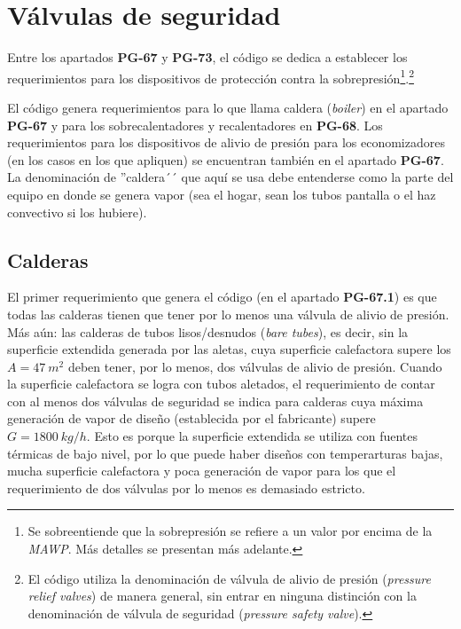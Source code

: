 \newpage
\section{Válvulas de seguridad}

Entre los apartados \textbf{PG-67} y \textbf{PG-73}, el código se dedica a establecer los requerimientos para los dispositivos de protección contra la sobrepresión\footnote{Se sobreentiende que la sobrepresión se refiere a un valor por encima de la \textit{MAWP}. Más detalles se presentan más adelante.}.\footnote{El código utiliza la denominación de válvula de alivio de presión (\textit{pressure relief valves}) de manera general, sin entrar en ninguna distinción con la denominación de válvula de seguridad (\textit{pressure safety valve}).} %

El código genera requerimientos para lo que llama caldera (\textit{boiler}) en el apartado \textbf{PG-67} y para los sobrecalentadores y recalentadores en \textbf{PG-68}. Los requerimientos para los dispositivos de alivio de presión para los economizadores (en los casos en los que apliquen) se encuentran también en el apartado \textbf{PG-67}. La denominación de ''caldera´´ que aquí se usa debe entenderse como la parte del equipo en donde se genera vapor (sea el hogar, sean los tubos pantalla o el haz convectivo si los hubiere).

\subsection{Calderas}

El primer requerimiento que genera el código (en el apartado \textbf{PG-67.1}) es que todas las calderas tienen que tener por lo menos una válvula de alivio de presión. Más aún: las calderas de tubos lisos/desnudos (\textit{bare tubes}), es decir, sin la superficie extendida generada por las aletas, cuya superficie calefactora supere los $A=\SI{47}{m^2}$ deben tener, por lo menos, dos válvulas de alivio de presión. Cuando la superficie calefactora se logra con tubos aletados, el requerimiento de contar con al menos dos válvulas de seguridad se indica para calderas cuya máxima generación de vapor de diseño (establecida por el fabricante) supere $G=\SI{1800}{kg/h}$. Esto es porque la superficie extendida se utiliza con fuentes térmicas de bajo nivel, por lo que puede haber diseños con temperarturas bajas, mucha superficie calefactora y poca generación de vapor para los que el requerimiento de dos válvulas por lo menos es demasiado estricto.

